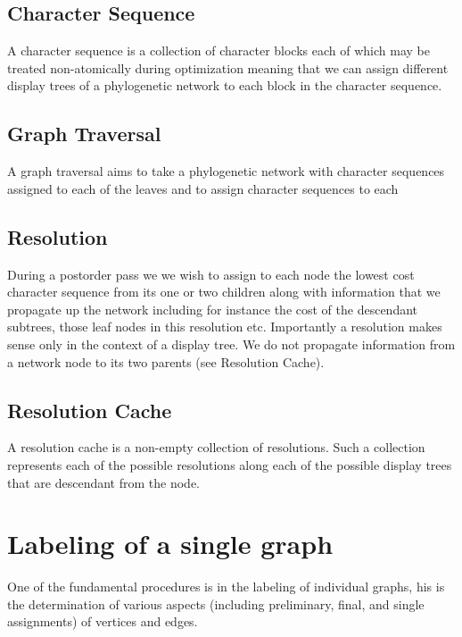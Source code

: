 \documentclass[11pt]{article}
\begin{document}
\subsection{Character Sequence}

A character sequence is a collection of character blocks each of which may be treated non-atomically during optimization meaning that we can assign different display trees of a phylogenetic network to each block in the character sequence.

\subsection{Graph Traversal}

A graph traversal aims to take a phylogenetic network with character sequences assigned to each of the leaves and to assign character sequences to each

\subsection{Resolution}

During a postorder pass we we wish to assign to each node the lowest cost character sequence from its one or two children along with information that we propagate up the network including for instance the cost of the descendant subtrees, those leaf nodes in this resolution etc. 
Importantly a resolution makes sense only in the context of a display tree. 
We do not propagate information from a network node to its two parents (see Resolution Cache).

\subsection{Resolution Cache}

A resolution cache is a non-empty collection of resolutions. 
Such a collection represents each of the possible resolutions along each of the possible display trees that are descendant from the node.


\section{Labeling of a single graph} \label{Labelling of a single graph}
One of the fundamental procedures is in the labeling of individual graphs,  his is the determination of various aspects (including preliminary, final, and single assignments) of vertices and edges.   
\end{document}
